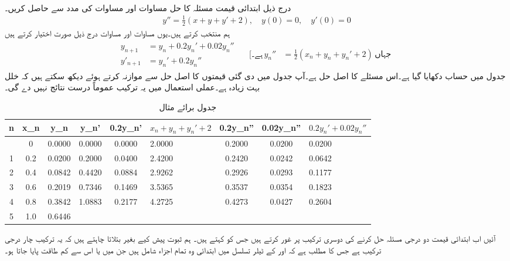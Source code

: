 \quad {}\\
درج ذیل ابتدائی قیمت مسئلہ کا حل مساوات  اور مساوات  کی مدد سے حاصل کریں۔
\begin{align*}
y''=\tfrac{1}{2}(x+y+y'+2),\quad y(0)=0,\quad y'(0)=0
\end{align*}
ہم  منتخب کرتے ہیں۔یوں مساوات  اور مساوات  درج ذیل صورت اختیار کرتے ہیں
\begin{gather*}
\begin{aligned}
y_{n+1}&=y_n+0.2y_n'+0.02y_n''\\
y'_{n+1}&=y_n'+0.2y_n''
\end{aligned}\quad
\begin{aligned}
[\text{ہے۔}\, y_n''&=\tfrac{1}{2}(x_n+y_n+y_n'+2) \, \text{جہاں}\
\end{aligned}
\end{gather*}
جدول  میں حساب دکھایا گیا ہے۔اس مسئلے کا اصل حل  ہے۔آپ جدول میں دی گئی قیمتوں کا اصل حل سے موازنہ کرتے ہوئے  دیکھ سکتے ہیں کہ خلل بہت زیادہ ہے۔عملی استعمال میں یہ ترکیب عموماً  درست نتائج نہیں دے گی۔
\begin{table}
\caption{جدول برائے مثال }
\label{جدول_مثال_اعدادی_دو_درجی_سادہ_الف}
\centering
\begin{otherlanguage}{english}
\begin{tabular}{|C|C|C|C|C|p{15mm}|C|C|p{10mm}|}
\hline
n&x_n&y_n&y_n'&0.2y_n'&$x_n+y_n+y_n'+2$&0.2y_n''&0.02y_n''&$0.2y_n'+0.02y_n''$\\
\hline{}&0&0.0000&0.0000&0.0000&2.0000&0.2000&0.0200&0.0200\\
1&0.2&0.0200&0.2000&0.0400&2.4200&0.2420&0.0242&0.0642\\
2&0.4&0.0842&0.4420&0.0884&2.9262&0.2926&0.0293&0.1177\\
3&0.6&0.2019&0.7346&0.1469&3.5365&0.3537&0.0354&0.1823\\
4&0.8&0.3842&1.0883&0.2177&4.2725&0.4273&0.0427&0.2604\\
5&1.0&0.6446&&&&&&\\
\hline
\end{tabular}
\end{otherlanguage}
\end{table}
آئیں اب ابتدائی قیمت دو درجی مسئلہ حل کرنے کی دوسری ترکیب پر غور کرتے ہیں جس کو  کہتے ہیں۔ ہم ثبوت پیش کیے  بغیر بتلاتا چاہتے ہیں کہ یہ ترکیب چار درجی ترکیب ہے جس کا مطلب ہے کہ  اور  کے ٹیلر تسلسل میں ابتدائی وہ تمام اجزاء شامل ہیں جن  میں   یا اس سے کم طاقت پایا جاتا ہو۔  

